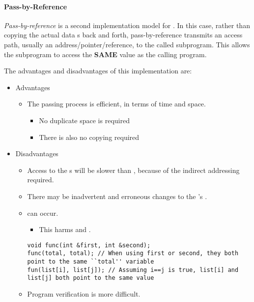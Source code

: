 \paragraph{Pass-by-Reference}\label{par:Parameter_Passing-Pass_By_Reference}
\begin{definition}\label{def:Pass_By_Reference}
  \emph{Pass-by-reference} is a second implementation model for .
  In this case, rather than copying the actual data s back and forth, pass-by-reference transmits an access path, usually an address/pointer/reference, to the called subprogram.
  This allows the subprogram to access the \textbf{SAME} value as the calling program.

  The advantages and disadvantages of this implementation are:
  \begin{itemize}[noitemsep]
  \item Advantages
    \begin{itemize}[noitemsep]
    \item The passing process is efficient, in terms of time and space.
      \begin{itemize}[noitemsep]
      \item No duplicate space is required
      \item There is also no copying required
      \end{itemize}
    \end{itemize}
  \item Disadvantages
    \begin{itemize}[noitemsep]
    \item Access to the s will be slower than , because of the indirect addressing required.
    \item There may be inadvertent and erroneous changes to the 's .
    \item {} can occur.
      \begin{itemize}[noitemsep]
      \item This harms  and .
      \end{itemize}
\begin{verbatim}
void func(int &first, int &second);
func(total, total); // When using first or second, they both point to the same ``total'' variable
fun(list[i], list[j]); // Assuming i==j is true, list[i] and list[j] both point to the same value
\end{verbatim}
    \item Program verification is more difficult.
    \end{itemize}
  \end{itemize}
\end{definition}

